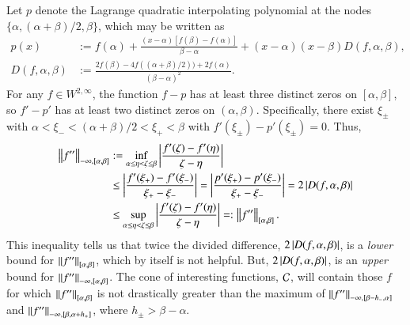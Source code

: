 \documentclass[review]{elsarticle}
\theoremstyle{definition}
\renewcommand{\cw}{W}
\begin{document}
Let $p$ denote the Lagrange quadratic interpolating polynomial at the nodes
$\{\alpha, (\alpha + \beta)/2, \beta\}$, which may be written as
\begin{align}
\nonumber
   p(x) & := f(\alpha) + \frac{(x-\alpha)[f(\beta) - f(\alpha)]}{\beta - \alpha}  +
   (x-\alpha)(x-\beta) D(f,\alpha,\beta),
\\ D(f,\alpha,\beta) &:= \frac{2f(\beta) - 4f((\alpha + \beta)/2))
	+ 2f(\alpha)}{(\beta - \alpha)^2}. \label{divdiffdef}
\end{align}
For any $f \in \cw^{2,\infty}$, the function $f - p$ has at least three distinct
zeros on $[\alpha,\beta]$, so $f' - p'$ has at least two distinct zeros on
$(\alpha,\beta)$.  Specifically, there exist $\xi_\pm$ with $\alpha < \xi_- < (\alpha +
\beta)/2 < \xi_+ < \beta$ with $f'(\xi_\pm) - p'(\xi_{\pm}) = 0$. Thus,
\begin{align}
     \norm[-\infty,{[\alpha,\beta]}]{f''}
   & := \inf_{\alpha \le \eta < \zeta \le \beta} \abs{\frac{f'(\zeta) - f'(\eta)}{\zeta - \eta}}
   \nonumber
\\ & \le \abs{\frac{f'(\xi_+) - f'(\xi_-)}{\xi_+ - \xi_-}}
   = \abs{\frac{p'(\xi_+) - p'(\xi_-)}{\xi_+ - \xi_-}} = 2 \abs{D(f,\alpha,\beta)}  \nonumber
\\ & \le \sup_{\alpha \le \eta < \zeta \le \beta} \abs{\frac{f'(\zeta) - f'(\eta)}{\zeta - \eta}}
=: \norm[{[\alpha,\beta]}]{f''}. \label{NDDbdm}
\end{align}
This inequality tells us that twice the divided difference,
$2\abs{D(f,\alpha,\beta)}$, is a \emph{lower} bound for
$\norm[{[\alpha,\beta]}]{f''}$, which by itself is not helpful. But,
$2\abs{D(f,\alpha,\beta)}$, is an \emph{upper} bound for
$\norm[-\infty,{[\alpha,\beta]}]{f''}$. The cone of interesting functions,
$\cc$, will contain those $f$ for which $\norm[{[\alpha,\beta]}]{f''}$ is not
drastically greater than the maximum of $\norm[-\infty,{[\beta - h_-,
\alpha]}]{f''}$ and $\norm[-\infty,{[\beta, \alpha+ h_+]}]{f''}$, where $h_{\pm} > \beta -
\alpha$.
\end{document}
